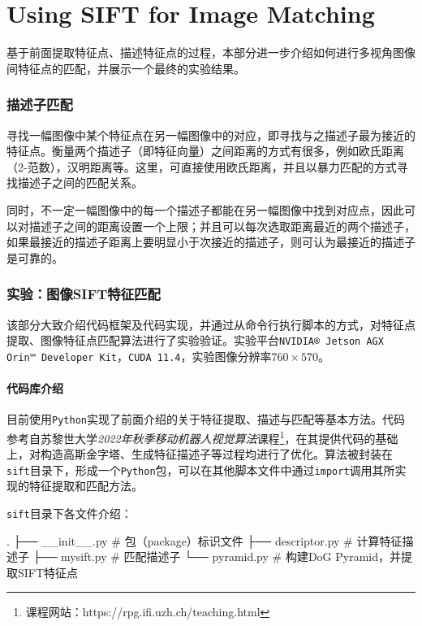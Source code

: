 \part{Using SIFT for Image Matching}\label{part:Matching descriptors}

基于前面提取\sift 特征点、描述\sift 特征点的过程，本部分进一步介绍如何进行多视角图像间特征点的匹配，并展示一个最终的实验结果。

\section{描述子匹配}

寻找一幅图像中某个特征点在另一幅图像中的对应，即寻找与之描述子最为接近的特征点。衡量两个描述子（即特征向量）之间距离的方式有很多，例如欧氏距离（2-范数），汉明距离等。这里，可直接使用欧氏距离，并且以暴力匹配的方式寻找描述子之间的匹配关系。

同时，不一定一幅图像中的每一个描述子都能在另一幅图像中找到对应点，因此可以对描述子之间的距离设置一个上限；并且可以每次选取距离最近的两个描述子，如果最接近的描述子距离上要明显小于次接近的描述子，则可认为最接近的描述子是可靠的。

\section{实验：图像SIFT特征匹配}

该部分大致介绍代码框架及代码实现，并通过从命令行执行脚本的方式，对\sift 特征点提取、图像\sift 特征点匹配算法进行了实验验证。实验平台\texttt{NVIDIA® Jetson AGX Orin™ Developer Kit}，\texttt{CUDA 11.4}，实验图像分辨率$760\times 570$。

\subsection{代码库介绍}

目前使用\texttt{Python}实现了前面介绍的关于\sift 特征提取、描述与匹配等基本方法。代码参考自苏黎世大学\emph{2022年秋季移动机器人视觉算法}课程\footnote{课程网站：https://rpg.ifi.uzh.ch/teaching.html}，在其提供代码的基础上，对构造高斯金字塔、生成特征描述子等过程均进行了优化。算法被封装在\texttt{sift}目录下，形成一个\texttt{Python}包，可以在其他脚本文件中通过\texttt{import}调用其所实现的\sift 特征提取和匹配方法。

\texttt{sift}目录下各文件介绍：
\begin{zshcode}
.
├── __init__.py  # 包（package）标识文件
├── descriptor.py  # 计算特征描述子
├── mysift.py  # 匹配描述子
└── pyramid.py  # 构建DoG Pyramid，并提取SIFT特征点
\end{zshcode}

